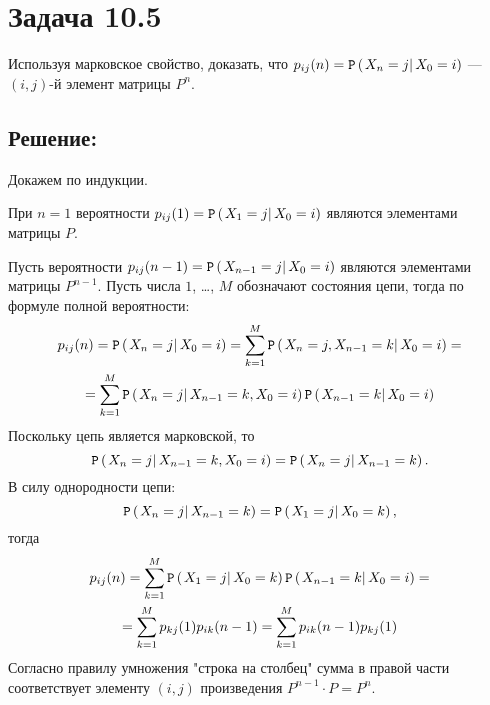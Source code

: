 \documentclass[12pt]{article}
\begin{document}
    \section*{Задача 10.5}
    Используя марковское свойство, доказать, что $p_{ij}(n) = \mathtt{P} \left ( \left . {X_n = j} \right | {X_0 = i} \right )$ --- $(i,j)$-й элемент матрицы $P^n$.

    \subsection*{Решение:}
    Докажем по индукции.

    При $n=1$ вероятности $p_{ij}(1) = \mathtt{P} \left ( \left . {X_1 = j} \right | {X_0 = i} \right )$ являются элементами матрицы $P$.

    Пусть вероятности $p_{ij}(n-1) = \mathtt{P} \left ( \left . {X_{n-1} = j} \right | {X_0 = i} \right )$ являются элементами матрицы $P^{n-1}$. Пусть числа $1$, \dots, $M$ обозначают состояния цепи, тогда
    по формуле полной вероятности:
    \begin{multline*}
        p_{ij}(n)
        = \mathtt{P} \left ( \left . {X_n = j} \right | {X_0 = i} \right )
        = \sum_{k=1}^M \mathtt{P} \left ( \left . {X_n = j, X_{n-1} = k} \right | {X_0 = i} \right ) = \\
        = \sum_{k=1}^M \mathtt{P} \left ( \left . {X_n = j} \right | {X_{n-1} = k, X_0 = i} \right ) \mathtt{P} \left ( \left . {X_{n-1} = k} \right | {X_0 = i} \right )
    \end{multline*}
    Поскольку цепь является марковской, то
    \[
        \mathtt{P} \left ( \left . {X_n = j} \right | {X_{n-1} = k, X_0 = i} \right )
        = \mathtt{P} \left ( \left . {X_n = j} \right | {X_{n-1} = k} \right ) .
    \]
    В силу однородности цепи:
    \[
        \mathtt{P} \left ( \left . {X_n = j} \right | {X_{n-1} = k} \right )
        = \mathtt{P} \left ( \left . {X_1 = j} \right | {X_0 = k} \right ),
    \]
    тогда
    \begin{multline*}
        p_{ij}(n)
        = \sum_{k=1}^M \mathtt{P} \left ( \left . {X_1 = j} \right | {X_0 = k} \right ) \mathtt{P} \left ( \left . {X_{n-1} = k} \right | {X_0 = i} \right ) = \\
        = \sum_{k=1}^M p_{kj}(1) p_{ik}(n-1)
        = \sum_{k=1}^M p_{ik}(n-1) p_{kj}(1)
    \end{multline*}
    Согласно правилу умножения "строка на столбец"{} сумма в правой части соответствует элементу $(i,j)$ произведения $P^{n-1} \cdot P = P^n$.
\end{document}
